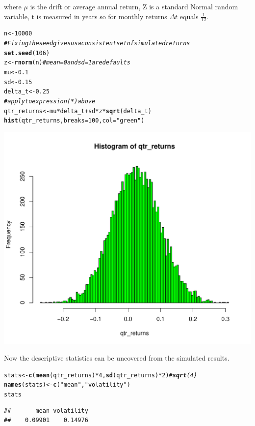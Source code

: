 \documentclass[12pt, a4paper, oneside]{article}\usepackage[]{graphicx}\usepackage[]{color}
\makeatletter
\def\maxwidth{ %
  \ifdim\Gin@nat@width>\linewidth
    \linewidth
  \else
    \Gin@nat@width
  \fi
}
\newcommand{\hlstr}[1]{\textcolor[rgb]{0.192,0.494,0.8}{#1}}%
\newcommand{\hlcom}[1]{\textcolor[rgb]{0.678,0.584,0.686}{\textit{#1}}}%
\newcommand{\hlkwd}[1]{\textcolor[rgb]{0.737,0.353,0.396}{\textbf{#1}}}%
\newenvironment{kframe}{%
 \def\at@end@of@kframe{}%
 \ifinner\ifhmode%
  \def\at@end@of@kframe{\end{minipage}}%
  \begin{minipage}{\columnwidth}%
 \fi\fi%
 \def\FrameCommand##1{\hskip\@totalleftmargin \hskip-\fboxsep
 \colorbox{shadecolor}{##1}\hskip-\fboxsep
     \hskip-\linewidth \hskip-\@totalleftmargin \hskip\columnwidth}%
 \MakeFramed {\advance\hsize-\width
   \@totalleftmargin\z@ \linewidth\hsize
   \@setminipage}}%
 {\par\unskip\endMakeFramed%
 \at@end@of@kframe}
\newenvironment{knitrout}{}{} %
\makeatother
\begin{document}
where $\mu$ is the drift or average annual return, Z is a standard Normal random variable, t is measured in years so for monthly returns $\Delta t$ equals $\frac{1}{12}$.

\begin{knitrout}
\color{fgcolor}\begin{kframe}
\begin{alltt}
n <- 10000
\hlcom{# Fixing the seed gives us a consistent set of simulated returns}
\hlkwd{set.seed}(106)
z <- \hlkwd{rnorm}(n)  \hlcom{# mean = 0 and sd = 1 are defaults}
mu <- 0.1
sd <- 0.15
delta_t <- 0.25
\hlcom{# apply to expression (*) above}
qtr_returns <- mu * delta_t + sd * z * \hlkwd{sqrt}(delta_t)
\hlkwd{hist}(qtr_returns, breaks = 100, col = \hlstr{"green"})
\end{alltt}
\end{kframe}
\includegraphics[width=\maxwidth]{figure/MC} 

\end{knitrout}


Now the descriptive statistics can be uncovered from the simulated results. 
\begin{knitrout}
\color{fgcolor}\begin{kframe}
\begin{alltt}
stats <- \hlkwd{c}(\hlkwd{mean}(qtr_returns) * 4, \hlkwd{sd}(qtr_returns) * 2)  \hlcom{# \hlkwd{sqrt}(4)}
\hlkwd{names}(stats) <- \hlkwd{c}(\hlstr{"mean"}, \hlstr{"volatility"})
stats
\end{alltt}
\begin{verbatim}
##       mean volatility 
##    0.09901    0.14976
\end{verbatim}
\end{kframe}
\end{knitrout}
\end{document}
